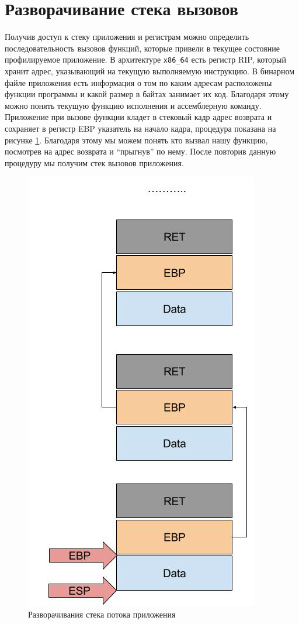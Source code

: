 \section{Разворачивание стека вызовов}
	Получив доступ к стеку приложения и регистрам можно определить последовательность вызовов функций, которые привели в текущее состояние профилируемое приложение. В архитектуре \verb|x86_64| есть регистр RIP, который хранит адрес, указывающий на текущую выполняемую инструкцию. В бинарном файле приложения есть информация о том по каким адресам расположены функции программы и какой размер в байтах занимает их код. Благодаря этому можно понять текущую функцию исполнения и ассемблерную команду. Приложение при вызове функции кладет в стековый кадр адрес возврата и сохраняет в регистр EBP указатель на начало кадра, процедура показана на рисунке \ref{fig:call_stack}. Благодаря этому мы можем понять кто вызвал нашу функцию, посмотрев на адрес возврата и \enquote{прыгнув} по нему. После повторив данную процедуру мы получим стек вызовов приложения.
    
    \begin{figure}[H]
        \caption{Разворачивания стека потока приложения}
        \label{fig:call_stack}	
        \centering
        \includegraphics[scale=0.5]{images/call_stack}
    \end{figure}  
    
